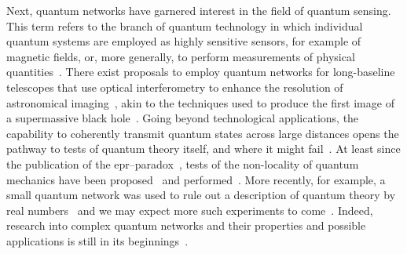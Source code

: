 Next, quantum networks have garnered interest in the field of quantum sensing.
This term refers to the branch of quantum technology in which individual quantum systems are employed as highly sensitive sensors, for example of magnetic fields, or, more generally, to perform measurements of physical quantities~\cite{Giovannetti2004,Degen2017}.
There exist proposals to employ quantum networks for long-baseline telescopes that use optical interferometry to enhance the resolution of astronomical imaging~\cite{Gottesman2012,Khabiboulline2019}, akin to the techniques used to produce the first image of a supermassive black hole~\cite{TheEventHorizonTelescopeCollaboration2019}.
Going beyond technological applications, the capability to coherently transmit quantum states across large distances opens the pathway to tests of quantum theory itself, and where it might fail~\cite{Weinberg1989}.
At least since the publication of the \gls{epr}--paradox~\cite{Einstein1935}, tests of the non-locality of quantum mechanics have been proposed~\cite{Bell1964,Clauser1969} and performed~\cite{Hensen2015,Storz2023}.
More recently, for example, a small quantum network was used to rule out a description of quantum theory by real numbers~\cite{Li2022} and we may expect more such experiments to come~\cite{Shadbolt2014}.
Indeed, research into complex quantum networks and their properties and possible applications is still in its beginnings~\cite{Nokkala2024}.


